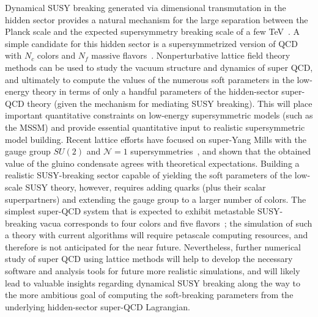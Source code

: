 \begin{itemize}
Dynamical SUSY breaking generated via dimensional transmutation in the hidden sector provides a natural mechanism for the large separation between the Planck scale and the expected supersymmetry breaking scale of a few TeV~\cite{Witten:1981nf}.  A simple candidate for this hidden sector is a supersymmetrized version of QCD with $N_c$ colors and $N_f$ massive flavors~\cite{Intriligator:2006dd}.  Nonperturbative lattice field theory methods can be used to study the vacuum structure and dynamics of super QCD, and ultimately to compute the values of the numerous soft parameters in the low-energy theory in terms of only a handful parameters of the hidden-sector super-QCD theory (given the mechanism for mediating SUSY breaking).  This will place important quantitative constraints on low-energy supersymmetric models (such as the MSSM) and provide essential quantitative input to realistic supersymmetric model building.
Recent lattice efforts have focused on super-Yang Mills with the gauge group $SU(2)$ and ${\mathcal N}=1$ supersymmetries~\cite{Giedt:2008xm,Endres:2009yp,Demmouche:2010sf}, and shown that the obtained value of the gluino condensate agrees with theoretical expectations.  Building a realistic SUSY-breaking sector capable of yielding the soft parameters of the low-scale SUSY theory, however, requires adding quarks (plus their scalar superpartners) and extending the gauge group to a larger number of colors.  The simplest super-QCD system that is expected to exhibit metastable SUSY-breaking vacua corresponds to four colors and five flavors~\cite{Intriligator:2006dd};  the simulation of such a theory with current algorithms will require petascale computing resources, and therefore is not anticipated for the near future.  Nevertheless, further numerical study of super QCD using lattice methods will help to develop the necessary software and analysis tools for future more realistic simulations, and will likely lead to valuable insights regarding dynamical SUSY breaking along the way to the more ambitious goal of computing the soft-breaking parameters from the underlying hidden-sector super-QCD Lagrangian.

\end{itemize}

